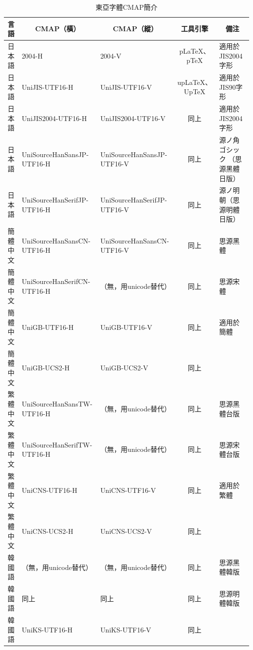 \begin{table}[H]
\caption{東亞字體CMAP簡介}
{\fontsize{8pt}{12}\selectfont\ttfamily
\begin{tabular}{|c|l|l|c|l|}
\hline
 \multicolumn{1}{|c|}{言 語} & \multicolumn{1}{|c|}{CMAP（橫）}%
  &\multicolumn{1}{|c|}{CMAP（縱）}& \multicolumn{1}{|c|}{工具引擎} & \multicolumn{1}{|c|}{備注} \\ \hline
日本語& 2004-H & 2004-V & {p\LaTeX}、{p\TeX} & 適用於JIS2004字形 \\
日本語& UniJIS-UTF16-H & UniJIS-UTF16-V & {up\LaTeX}、{Up\TeX} & 適用於JIS90字形 \\
日本語& UniJIS2004-UTF16-H & UniJIS2004-UTF16-V & 同上 & 適用於JIS2004字形 \\
日本語& UniSourceHanSansJP-UTF16-H & UniSourceHanSansJP-UTF16-V & 同上 & 源ノ角ゴシック （思源黑體日版） \\
日本語& UniSourceHanSerifJP-UTF16-H & UniSourceHanSerifJP-UTF16-V & 同上 & 源ノ明朝（思源明體日版） \\ \hline
簡體中文& UniSourceHanSansCN-UTF16-H & UniSourceHanSansCN-UTF16-V & 同上 & 思源黑體 \\
簡體中文& UniSourceHanSerifCN-UTF16-H & （無，用unicode替代） & 同上 & 思源宋體 \\
簡體中文& UniGB-UTF16-H & UniGB-UTF16-V & 同上 & 適用於簡體 \\
簡體中文& UniGB-UCS2-H & UniGB-UCS2-V & 同上 &  \\ \hline
繁體中文& UniSourceHanSansTW-UTF16-H & （無，用unicode替代） & 同上 & 思源黑體台版 \\
繁體中文& UniSourceHanSerifTW-UTF16-H & （無，用unicode替代） & 同上 & 思源宋體台版 \\
繁體中文& UniCNS-UTF16-H & UniCNS-UTF16-V & 同上 & 適用於繁體 \\
繁體中文& UniCNS-UCS2-H & UniCNS-UCS2-V & 同上 &  \\ \hline
韓國語& （無，用unicode替代） & （無，用unicode替代） & 同上 & 思源黑體韓版 \\
韓國語& 同上 & 同上 & 同上 & 思源明體韓版 \\
韓國語& UniKS-UTF16-H & UniKS-UTF16-V & 同上 &  \\ \hline
\end{tabular} }
\end{table}



